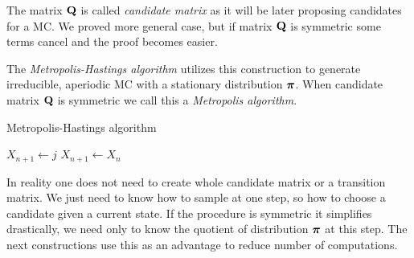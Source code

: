 	The matrix $\mathbf{Q}$ is called \textit{candidate matrix} as it will be later proposing candidates for a MC. We proved more general case, but if matrix $\mathbf{Q}$ is symmetric some terms cancel and the proof becomes easier.
	
	The \textit{Metropolis-Hastings algorithm} utilizes this construction to generate irreducible, aperiodic MC with a stationary distribution $\boldsymbol{\pi}$. When candidate matrix $\mathbf{Q}$ is symmetric we call this a \textit{Metropolis algorithm}.
	\begin{algorithm}
		\caption{Metropolis-Hastings algorithm}\label{alg:metro-hast}
		\begin{algorithmic}[1]
				
					\State $X_{n+1} \gets j$
				\Else
					\State $X_{n+1} \gets X_n$
				\EndIf
			\EndFor
		\end{algorithmic}
	\end{algorithm}
	
	In reality one does not need to create whole candidate matrix or a transition matrix. We just need to know how to sample at one step, so how to choose a candidate given a current state. If the procedure is symmetric it simplifies drastically, we need only to know the quotient of distribution $\boldsymbol{\pi}$ at this step. The next constructions use this as an advantage to reduce number of computations.
	